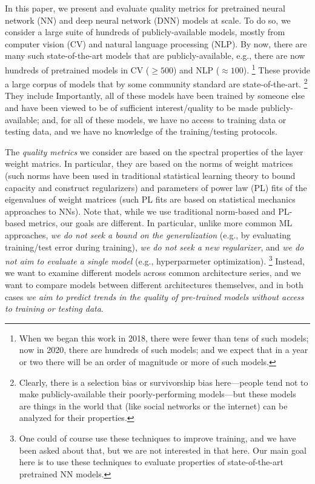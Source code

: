 In this paper, we present and evaluate quality metrics for pretrained neural network (NN) and deep neural network (DNN) models at scale.
To do so, we consider a large suite of hundreds of publicly-available models, mostly from computer vision (CV) and natural language processing (NLP).
%
By now, there are many such state-of-the-art models that are publicly-available, e.g., 
there are now hundreds of pretrained models in CV ($\ge 500$) and NLP ($\approx 100$).%
\footnote{When we began this work in 2018, there were fewer than tens of such models; now in 2020, there are hundreds of such models; and we expect that in a year or two there will be an order of magnitude or more of such models.}
These provide a large corpus of models that by some community standard are state-of-the-art.%
\footnote{Clearly, there is a selection bias or survivorship bias here---people tend not to make publicly-available their poorly-performing models---but these models are things in the world that (like social networks or the internet) can be analyzed for their properties.}
They include 
Importantly, all of these models have been trained by someone else and have been viewed to be of sufficient interest/quality to be made publicly-available; and, for all of these models, we have no access to training data or testing data, and we have no knowledge of the training/testing protocols. 

The \emph{quality metrics} we consider are based on the spectral properties of the layer weight matrics.
In particular, they are based on the norms of weight matrices (such norms have been used in traditional statistical learning theory to bound capacity and construct regularizers) and parameters of power law (PL) fits of the eigenvalues of weight matrices (such PL fits are based on statistical mechanics approaches to NNs).
Note that, while we use traditional norm-based and PL-based metrics, our goals are different.
In particular, unlike more common ML approaches, \emph{we do not seek a bound on the generalization} (e.g., by evaluating training/test error during training), \emph{we do not seek a new regularizer}, and \emph{we do not aim to evaluate a single model} (e.g., hyperparmeter optimization).%
\footnote{One could of course use these techniques to improve training, and we have been asked about that, but we are not interested in that here. Our main goal here is to use these techniques to evaluate properties of state-of-the-art pretrained NN models.}
Instead, we want to examine different models across common architecture series, and we want to compare models between different architectures themselves, and in both cases \emph{we aim to predict trends in the quality of pre-trained models without access to training or testing data}.  


